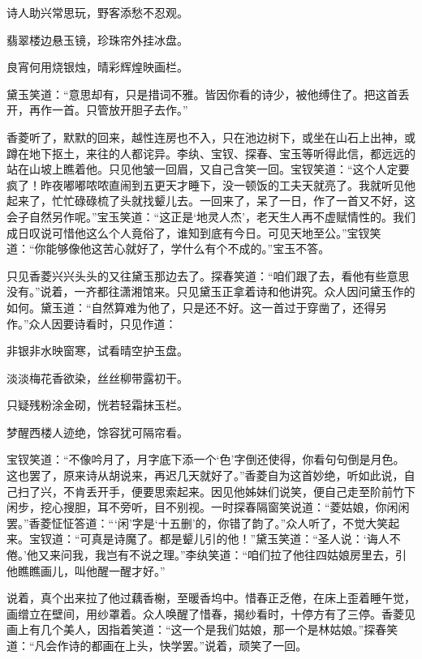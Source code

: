 诗人助兴常思玩，野客添愁不忍观。

翡翠楼边悬玉镜，珍珠帘外挂冰盘。

良宵何用烧银烛，晴彩辉煌映画栏。

黛玉笑道：“意思却有，只是措词不雅。皆因你看的诗少，被他缚住了。把这首丢开，再作一首。只管放开胆子去作。”

香菱听了，默默的回来，越性连房也不入，只在池边树下，或坐在山石上出神，或蹲在地下抠土，来往的人都诧异。李纨、宝钗、探春、宝玉等听得此信，都远远的站在山坡上瞧着他。只见他皱一回眉，又自己含笑一回。宝钗笑道：“这个人定要疯了！昨夜嘟嘟哝哝直闹到五更天才睡下，没一顿饭的工夫天就亮了。我就听见他起来了，忙忙碌碌梳了头就找颦儿去。一回来了，呆了一日，作了一首又不好，这会子自然另作呢。”宝玉笑道：“这正是‘地灵人杰’，老天生人再不虚赋情性的。我们成日叹说可惜他这么个人竟俗了，谁知到底有今日。可见天地至公。”宝钗笑道：“你能够像他这苦心就好了，学什么有个不成的。”宝玉不答。

只见香菱兴兴头头的又往黛玉那边去了。探春笑道：“咱们跟了去，看他有些意思没有。”说着，一齐都往潇湘馆来。只见黛玉正拿着诗和他讲究。众人因问黛玉作的如何。黛玉道：“自然算难为他了，只是还不好。这一首过于穿凿了，还得另作。”众人因要诗看时，只见作道：

非银非水映窗寒，试看晴空护玉盘。

淡淡梅花香欲染，丝丝柳带露初干。

只疑残粉涂金砌，恍若轻霜抹玉栏。

梦醒西楼人迹绝，馀容犹可隔帘看。

宝钗笑道：“不像吟月了，月字底下添一个‘色’字倒还使得，你看句句倒是月色。这也罢了，原来诗从胡说来，再迟几天就好了。”香菱自为这首妙绝，听如此说，自己扫了兴，不肯丢开手，便要思索起来。因见他姊妹们说笑，便自己走至阶前竹下闲步，挖心搜胆，耳不旁听，目不别视。一时探春隔窗笑说道：“菱姑娘，你闲闲罢。”香菱怔怔答道：“‘闲’字是‘十五删’的，你错了韵了。”众人听了，不觉大笑起来。宝钗道：“可真是诗魔了。都是颦儿引的他！”黛玉笑道：“圣人说：‘诲人不倦。’他又来问我，我岂有不说之理。”李纨笑道：“咱们拉了他往四姑娘房里去，引他瞧瞧画儿，叫他醒一醒才好。”

说着，真个出来拉了他过藕香榭，至暖香坞中。惜春正乏倦，在床上歪着睡午觉，画缯立在壁间，用纱罩着。众人唤醒了惜春，揭纱看时，十停方有了三停。香菱见画上有几个美人，因指着笑道：“这一个是我们姑娘，那一个是林姑娘。”探春笑道：“凡会作诗的都画在上头，快学罢。”说着，顽笑了一回。

